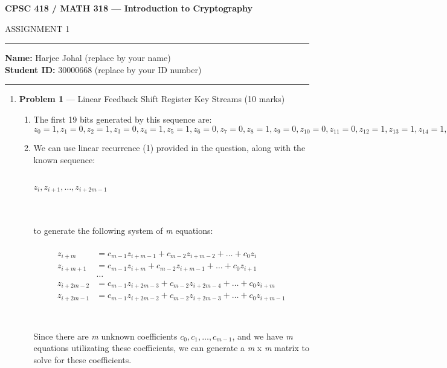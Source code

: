 \documentclass[11pt]{article}
\theoremstyle{definition}
\begin{document}
\begin{center}
{\bf \Large CPSC 418 / MATH 318 --- Introduction to Cryptography

ASSIGNMENT 1 }
\end{center}

\hrule 	

\textbf{Name:} Harjee Johal (replace by your name) \\
\textbf{Student ID:} 30000668 (replace by your ID number)

\medskip \hrule

\begin{enumerate} \itemsep 20pt

\item[] \textbf{Problem 1} --- Linear Feedback Shift Register Key Streams (10 marks)

\begin{enumerate}

\item The first 19 bits generated by this sequence are: $z_0 = 1, z_1 = 0, z_2 = 1, z_3 = 0, z_4 = 1, z_5 = 1, z_6 = 0, z_7 = 0, z_8 = 1, z_9 = 0, z_{10} = 0, z_{11} = 0, z_{12} = 1, z_{13} = 1, z_{14} = 1, z_{15} = 1, z_{16} = 0, z_{17} = 1, z_{18} = 0$\\

\item We can use linear recurrence (1) provided in the question, along with the known sequence: \\ \\
\centerline{$z_{i}, z_{i+1}, \ldots , z_{i+2m-1}$}
\\ \\
to generate the following system of \textit{m} equations:\\ \\
\begin{align*}
z_{i+m} &= c_{m-1} z_{i+m-1} + c_{m-2} z_{i+m-2} + \ldots + c_0 z_i\\
z_{i+m+1} &= c_{m-1} z_{i+m} + c_{m-2} z_{i+m-1} + \ldots + c_0 z_{i+1}\\
&\ldots \\
z_{i+2m-2} &= c_{m-1} z_{i+2m-3} + c_{m-2} z_{i+2m-4} + \ldots + c_0 z_{i+m}\\
z_{i+2m-1} &= c_{m-1} z_{i+2m-2} + c_{m-2} z_{i+2m-3} + \ldots + c_0 z_{i+m-1}\\
\end{align*}
\\ \\
Since there are \textit{m} unknown coefficients $c_0, c_1, \ldots , c_{m-1}$, and we have \textit{m} equations utilizating these coefficients, we can generate a \textit{m} x \textit{m} matrix to solve for these coefficients.\\


\end{enumerate}
\end{enumerate}
\end{document}
